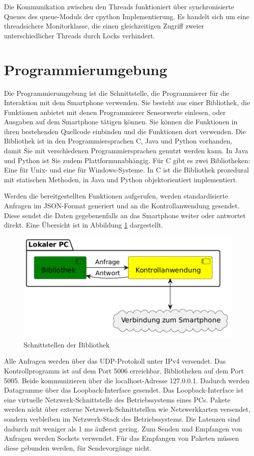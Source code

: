\documentclass[11pt,a4paper]{report}
\begin{document}
Die Kommunikation zwischen den Threads funktioniert über synchronisierte Queues des queue-Moduls\cite{python_queue} der cpython Implementierung.
Es handelt sich um eine threadsichere Monitorklasse, die einen gleichzeitigen Zugriff zweier unterschiedlicher Threads durch Locks verhindert.

\section{Programmierumgebung}\label{chap:libs}
Die Programmierumgebung ist die Schnittstelle, die Programmierer für die Interaktion mit dem Smartphone verwenden.
Sie besteht aus einer Bibliothek, die Funktionen anbietet mit denen Programmierer Sensorwerte einlesen, oder Ausgaben auf dem Smartphone tätigen können.
Sie können die Funktionen in ihren bestehenden Quellcode einbinden und die Funktionen dort verwenden.
Die Bibliothek ist in den Programmiersprachen C, Java und Python vorhanden, damit Sie mit verschiedenen Programmiersprachen genutzt werden kann.
In Java und Python ist Sie zudem Plattformunabhängig.
Für C gibt es zwei Bibliotheken: Eine für Unix- und eine für Windows-Systeme.
In C ist die Bibliothek prozedural mit statischen Methoden, in Java und Python objektorientiert implementiert.

Werden die bereitgestellten Funktionen aufgerufen, werden standardisierte Anfragen im JSON-Format generiert und an die Kontrollanwendung gesendet.
Diese sendet die Daten gegebenenfalls an das Smartphone weiter oder antwortet direkt.
Eine Übersicht ist in Abbildung \ref{fig:Schnittstelle Bibliothek} dargestellt.
\begin{figure}[htbp]
  \centering
  \includegraphics[width=.8\textwidth]{images/lib_server_connection}
  \caption{Schnittstellen der Bibliothek}
  \label{fig:Schnittstelle Bibliothek}
\end{figure}

Alle Anfragen werden über das UDP-Protokoll unter IPv4 versendet.
Das Kontrollprogramm ist auf dem Port 5006 erreichbar, Bibliotheken auf dem Port 5005.
Beide kommunizieren über die localhost-Adresse 127.0.0.1.
Dadurch werden Datagramme über das Loopback-Interface gesendet.
Das Loopback-Interface ist eine virtuelle Netzwerk-Schnittstelle des Betriebssystems eines PCs.
Pakete werden nicht über externe Netzwerk-Schnittstellen wie Netzwerkkarten versendet, sondern verbleiben im Netzwerk-Stack des Betriebssystems.
Die Latenzen sind dadurch mit weniger als 1 ms äußerst gering.
Zum Senden und Empfangen von Anfragen werden Sockets verwendet.
Für das Empfangen von Paketen müssen diese gebunden werden, für Sendevorgänge nicht.
\end{document}
